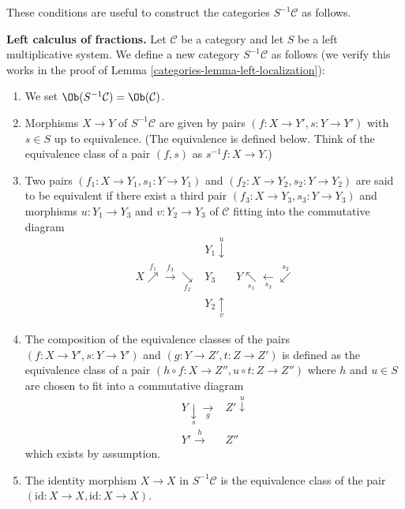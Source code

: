 These conditions are useful to construct the categories $S^{-1}\mathcal{C}$
as follows.

\medskip\noindent
{\bf Left calculus of fractions.}
Let $\mathcal{C}$ be a category and let $S$ be a left multiplicative
system. We define a new category $S^{-1}\mathcal{C}$ as follows
(we verify this works in the proof of
Lemma \ref{categories-lemma-left-localization}):
\begin{enumerate}
\item We set $\Ob(S^{-1}\mathcal{C}) = \Ob(\mathcal{C})$.
\item Morphisms $X \to Y$ of $S^{-1}\mathcal{C}$ are given by pairs
$(f : X \to Y', s : Y \to Y')$ with $s \in S$ up to equivalence.
(The equivalence is defined below. Think of the equivalence class
of a pair $(f, s)$ as $s^{-1}f : X \to Y$.)
\item Two pairs $(f_1 : X \to Y_1, s_1 : Y \to Y_1)$ and
$(f_2 : X \to Y_2, s_2 : Y \to Y_2)$ are said to be equivalent
if there exist a third pair $(f_3 : X \to Y_3, s_3 : Y \to Y_3)$
and morphisms $u : Y_1 \to Y_3$ and $v : Y_2 \to Y_3$ of $\mathcal{C}$
fitting into the commutative diagram
$$
\begin{array}{ccc} & Y_1 \overset{u}{\downarrow} &  \\ X \overset{f_1}{\nearrow}\overset{f_3}{\longrightarrow}\underset{f_2}{\searrow} & Y_3 & Y \underset{s_1}{\nwarrow}\underset{s_3}{\longleftarrow}\overset{s_2}{\swarrow} \\  & Y_2 \underset{v}{\uparrow} & \end{array}
$$
\item The composition of the equivalence classes of the pairs
$(f : X \to Y', s : Y \to Y')$ and $(g : Y \to Z', t : Z \to Z')$
is defined as the equivalence class of a pair
$(h \circ f : X \to Z'', u \circ t : Z \to Z'')$
where $h$ and $u \in S$ are chosen to fit into a commutative diagram
$$
\begin{array}{cc}Y \underset{s}{\downarrow}\underset{g}{\longrightarrow} & Z' \overset{u}{\downarrow} \\ Y' \overset{h}{\longrightarrow} & Z''\end{array}
$$
which exists by assumption.
\item The identity morphism $X \to X$ in $S^{-1} \mathcal{C}$ is the
equivalence class of the pair $(\text{id} : X \to X,
\text{id} : X \to X)$.
\end{enumerate}


